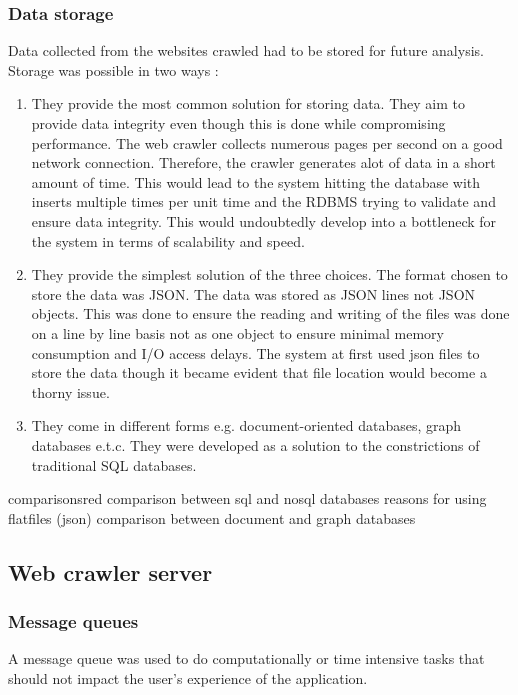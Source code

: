 \subsubsection{Data storage}
Data collected from the websites crawled had to be stored for future analysis. Storage was possible in two ways : 
\begin{enumerate}
\item {}
They provide the most common solution for storing data. They aim to provide data integrity even though this is done while compromising performance. The web crawler collects numerous pages per second on a good network connection. Therefore, the crawler generates alot of data in a short amount of time. This would lead to the system hitting the database with inserts multiple times per unit time and the RDBMS trying to validate and ensure data integrity. This would undoubtedly develop into a bottleneck for the system in terms of scalability and speed.

\item {}
They provide the simplest solution of the three choices. The format chosen to store the data was JSON. The data was stored as JSON lines not JSON objects. This was done to ensure the reading and writing of the files was done on a line by line basis not as one object to ensure minimal memory consumption and I/O access delays. The system at first used json files to store the data though it became evident that file location would become a thorny issue. 

\item {}
They come in different forms e.g. document-oriented databases, graph databases e.t.c. They were developed as a solution to the constrictions of traditional SQL databases.

\end{enumerate}
\begin{review_comment}{comparisons}{red}
{
    comparison between sql and nosql databases
    reasons for using flatfiles (json)
    comparison between document and graph databases
}
\end{review_comment}

\subsection{Web crawler server}
\subsubsection{Message queues}
A message queue was used to do computationally or time intensive tasks that should not impact the user's experience of the application.

